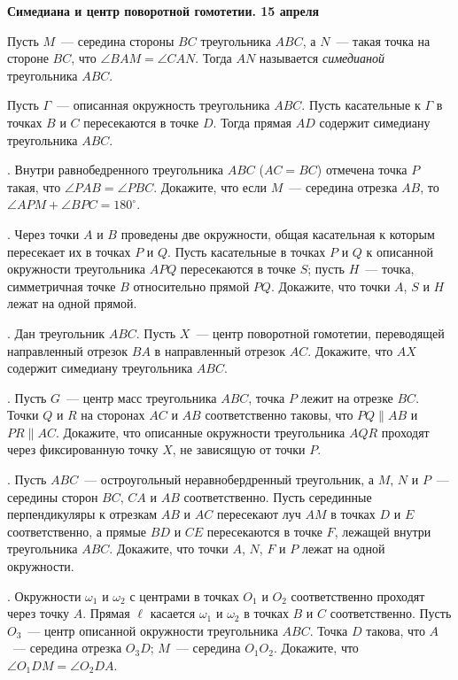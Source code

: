 \centerline{\bf Симедиана и центр поворотной гомотетии. 15 апреля}

\begin{definition}
Пусть $M$~--- середина стороны $BC$ треугольника $ABC$, а $N$~--- такая точка
на стороне $BC$, что $\angle BAM=\angle CAN$. Тогда $AN$ называется {\it симедианой}
треугольника $ABC$. 
\end{definition}

\begin{statement}
Пусть $\Gamma$~--- описанная окружность треугольника $ABC$. Пусть касательные к $\Gamma$
в точках $B$ и $C$ пересекаются в точке $D$. Тогда прямая $AD$ содержит симедиану треугольника $ABC$.
\end{statement}


. Внутри равнобедренного треугольника $ABC$ ($AC=BC$) отмечена точка $P$ такая,
что $\angle PAB=\angle PBC$. Докажите, что если $M$~--- середина отрезка $AB$,
то $\angle APM+\angle BPC=180^\circ$.

. Через точки $A$ и $B$ проведены две окружности, общая касательная к которым
пересекает их в точках $P$ и $Q$. Пусть касательные в точках $P$ и $Q$ 
к описанной окружности треугольника $APQ$ пересекаются в точке $S$; 
пусть $H$~--- точка, симметричная точке $B$ относительно прямой $PQ$.
Докажите, что точки $A$, $S$ и $H$ лежат на одной прямой. 

\medskip

. Дан треугольник $ABC$. Пусть $X$~--- центр поворотной гомотетии, переводящей
направленный отрезок $BA$ в направленный отрезок $AC$. Докажите, что $AX$ 
содержит симедиану треугольника $ABC$.

. Пусть $G$~--- центр масс треугольника $ABC$, точка $P$ лежит на отрезке $BC$.
Точки $Q$ и $R$ на сторонах  $AC$ и $AB$ соответственно таковы,
что $PQ\parallel AB$ и $PR\parallel AC$. Докажите, что описанные окружности
треугольника $AQR$ проходят через фиксированную точку $X$, не зависящую от точки $P$.

. Пусть $ABC$~--- остроугольный неравнобердренный треугольник, а $M$, $N$ и $P$~---
середины сторон $BC$, $CA$ и $AB$ соответственно. Пусть серединные
перпендикуляры к отрезкам $AB$ и $AC$ пересекают луч $AM$ в точках $D$ и $E$ соответственно,
а прямые $BD$ и $CE$ пересекаются в точке $F$, лежащей внутри треугольника $ABC$.
Докажите, что точки $A$, $N$, $F$ и $P$ лежат на одной окружности.

. Окружности $\omega_1$ и $\omega_2$ с центрами в точках $O_1$ и $O_2$ соответственно
проходят через точку $A$. Прямая $\ell$ касается $\omega_1$ и $\omega_2$ в точках
$B$ и $C$ соответственно. Пусть $O_3$~--- центр описанной окружности треугольника
$ABC$. Точка $D$ такова, что $A$~--- середина отрезка $O_3D$; $M$~--- середина $O_1O_2$. 
Докажите, что $\angle O_1DM=\angle O_2DA$.

 
